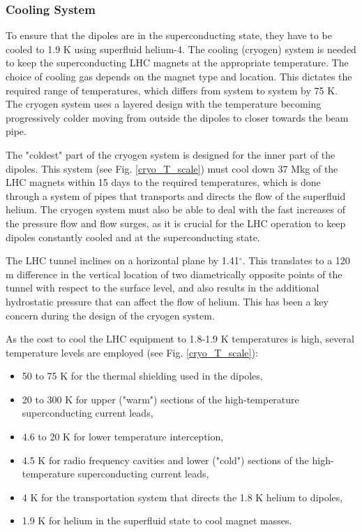\begin{normalsize}
\subsubsection{Cooling System}\label{sec:cryogenic}

To ensure that the dipoles are in the superconducting state, they have to be cooled to 1.9 K using superfluid helium-4. The cooling (cryogen) system is needed to keep the superconducting LHC magnets at the appropriate temperature. The choice of cooling gas depends on the magnet type and location. This dictates the required range of temperatures, which differs from system to system by 75 K. The cryogen system uses a layered design with the temperature becoming progressively colder moving from outside the dipoles to closer towards the beam pipe. 

The "coldest" part of the cryogen system is designed for the inner part of the dipoles. This system (see Fig. \ref{cryo_T_scale}) must cool down 37 Mkg of the LHC magnets within 15 days to the required temperatures, which is done through a system of pipes that transports and directs the flow of the superfluid helium. The cryogen system must also be able to deal with the fast increases of the pressure flow and flow surges, as it is crucial for the LHC operation to keep dipoles constantly cooled and at the superconducting state.


The LHC tunnel inclines on a horizontal plane by 1.41$^\circ$. This translates to a 120 m difference in the vertical location of two diametrically opposite points of the tunnel with respect to the surface level, and also results in the additional hydrostatic pressure that can affect the flow of helium. This has been a key concern during the design of the cryogen system.


As the cost to cool the LHC equipment to 1.8-1.9 K temperatures is high, several temperature levels are employed (see Fig. \ref{cryo_T_scale}):
 
\begin{itemize}
\item 50 to 75 K for the thermal shielding used in the dipoles,
\item 20 to 300 K for upper ("warm") sections of the high-temperature superconducting current leads,
\item 4.6 to 20 K for lower temperature interception,
\item 4.5 K for radio frequency cavities and lower ("cold") sections of the high-temperature superconducting current leads,
\item 4 K for the transportation system that directs the 1.8 K helium to dipoles,
\item 1.9 K for helium in the superfluid state to cool magnet masses.
\end{itemize}


\end{normalsize}
